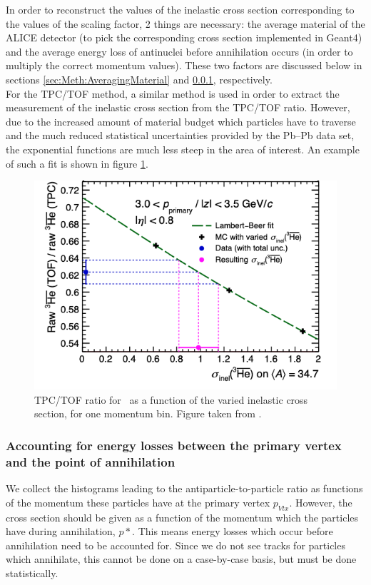 In order to reconstruct the values of the inelastic cross section corresponding to the values of the scaling factor, 2 things are necessary: the average material of the ALICE detector (to pick the corresponding cross section implemented in Geant4) and the average energy loss of antinuclei before annihilation occurs (in order to multiply the correct momentum values). These two factors are discussed below in sections \ref{sec:Meth:AveragingMaterial} and \ref{sec:Meth:ELoss}, respectively.\\

For the TPC/TOF method, a similar method is used in order to extract the measurement of the inelastic cross section from the TPC/TOF ratio. However, due to the increased amount of material budget which particles have to traverse and the much reduced statistical uncertainties provided by the Pb--Pb data set, the exponential functions are much less steep in the area of interest. An example of such a fit is shown in figure \ref{fig:TPCTOF_fit}. 

\begin{figure}
    \centering
    \includegraphics[width=\textwidth]{figures/TOF-TPC_ratio_xs_extraction.png}
    \caption{TPC/TOF ratio for \ahe\ as a function of the varied inelastic cross section, for one momentum bin. Figure taken from \cite{antiHe3XS}.}
    \label{fig:TPCTOF_fit}
\end{figure}


\subsubsection{Accounting for energy losses between the primary vertex and the point of annihilation}\label{sec:Meth:ELoss}
We collect the histograms leading to the antiparticle-to-particle ratio as functions of the momentum these particles have at the primary vertex $p_{Vtx}$. However, the cross section should be given as a function of the momentum which the particles have during annihilation, $p*$. This means energy losses which occur before annihilation need to be accounted for. Since we do not see tracks for particles which annihilate, this cannot be done on a case-by-case basis, but must be done statistically.\\

